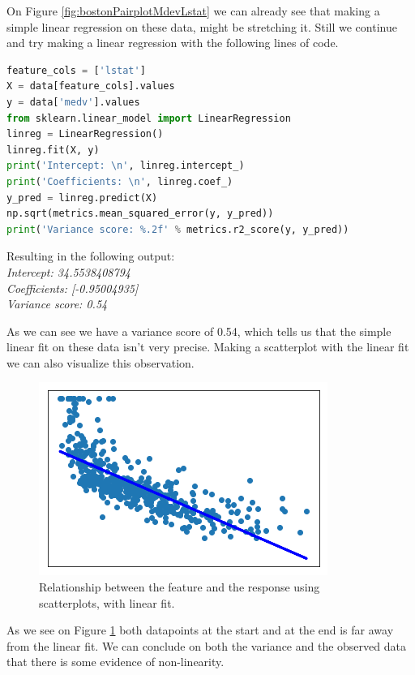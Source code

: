 On Figure \ref{fig:bostonPairplotMdevLstat} we can already see that making a simple linear regression on these data, might be stretching it. Still we continue and try making a linear regression with the following lines of code.

\begin{lstlisting}[language=Python]
feature_cols = ['lstat']
X = data[feature_cols].values
y = data['medv'].values
from sklearn.linear_model import LinearRegression
linreg = LinearRegression()
linreg.fit(X, y)
print('Intercept: \n', linreg.intercept_)
print('Coefficients: \n', linreg.coef_)
y_pred = linreg.predict(X)
np.sqrt(metrics.mean_squared_error(y, y_pred))
print('Variance score: %.2f' % metrics.r2_score(y, y_pred))
\end{lstlisting}

Resulting in the following output:\\
\textit{Intercept: 34.5538408794\\
Coefficients: [-0.95004935]\\
Variance score: 0.54\\}

As we can see we have a variance score of 0.54, which tells us that the simple linear fit on these data isn't very precise. Making a scatterplot with the linear fit we can also visualize this observation.

\begin{figure}[h]
	\centering
	\includegraphics[scale=0.6]{regression/multipleLinearRegression/fig/bostonScatterplotMdevLstatLinreg.png}
	\caption{Relationship between the feature and the response using scatterplots, with linear fit.}
	\label{fig:bostonScatterplotMdevLstatLinreg}
\end{figure}

As we see on Figure \ref{fig:bostonScatterplotMdevLstatLinreg} both datapoints at the start and at the end is far away from the linear fit. We can conclude on both the variance and the observed data that there is some evidence of non-linearity.

